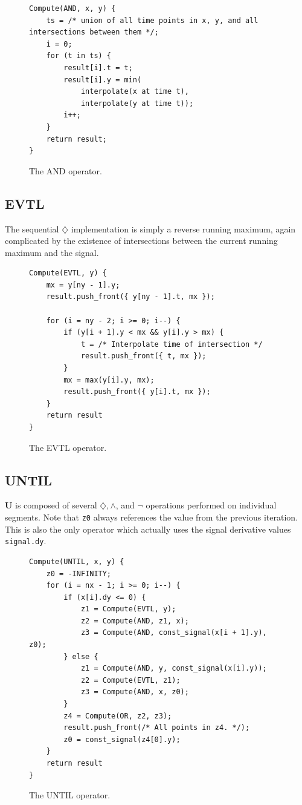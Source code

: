 \documentclass[a4paper,10pt]{article}
\renewcommand{\And}{\wedge}
\newcommand{\Neg}{\neg}
\newcommand{\Until}{\mathbf{U}}
\newcommand{\Evtl}{\diamondsuit}
\begin{document}
\begin{figure}[H]
\begin{lstlisting}
Compute(AND, x, y) {
    ts = /* union of all time points in x, y, and all intersections between them */;
    i = 0;
    for (t in ts) {
        result[i].t = t;
        result[i].y = min(
            interpolate(x at time t),
            interpolate(y at time t));
        i++;
    }
    return result;
}
\end{lstlisting}
\label{fig:and}
\caption{The AND operator.}
\end{figure}

\subsection{EVTL}

The sequential $\Evtl$ implementation is simply a reverse running maximum, again
complicated by the existence of intersections between the current running maximum
and the signal.

\begin{figure}[H]
\begin{lstlisting}
Compute(EVTL, y) {
    mx = y[ny - 1].y;
    result.push_front({ y[ny - 1].t, mx });

    for (i = ny - 2; i >= 0; i--) {
        if (y[i + 1].y < mx && y[i].y > mx) {
            t = /* Interpolate time of intersection */
            result.push_front({ t, mx });
        }
        mx = max(y[i].y, mx);
        result.push_front({ y[i].t, mx });
    }
    return result
}
\end{lstlisting}
\label{fig:evtl}
\caption{The EVTL operator.}
\end{figure}

\subsection{UNTIL}

$\Until$ is composed of several $\Evtl, \And$, and $\Neg$ operations performed on
individual segments. Note that \lstinline|z0| always references the value from the
previous iteration. This is also the only operator which actually uses the signal derivative
values \lstinline|signal.dy|.

\begin{figure}[H]
\begin{lstlisting}
Compute(UNTIL, x, y) {
    z0 = -INFINITY;
    for (i = nx - 1; i >= 0; i--) {
        if (x[i].dy <= 0) {
            z1 = Compute(EVTL, y);
            z2 = Compute(AND, z1, x);
            z3 = Compute(AND, const_signal(x[i + 1].y), z0);
        } else {
            z1 = Compute(AND, y, const_signal(x[i].y));
            z2 = Compute(EVTL, z1);
            z3 = Compute(AND, x, z0);
        }
        z4 = Compute(OR, z2, z3);
        result.push_front(/* All points in z4. */);
        z0 = const_signal(z4[0].y);
    }
    return result
}
\end{lstlisting}
\label{fig:until}
\caption{The UNTIL operator.}
\end{figure}
\end{document}
